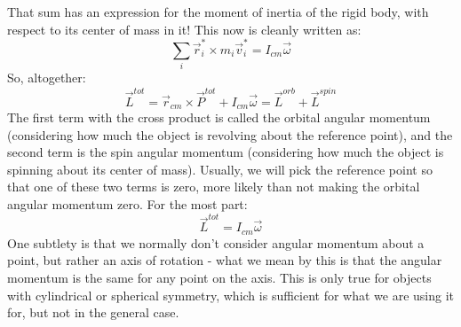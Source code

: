 That sum has an expression for the moment of inertia of the rigid body, with respect to its center of mass in it! This now is cleanly written as:
\[
	\sum_i \vec r_i^* \times m_i \vec v_i^* = I_{cm}\vec \omega
\]
So, altogether: 
\[
	\vec L^{tot} = \vec r_{cm} \times \vec P^{tot} + I_{cm} \vec \omega = \vec L^{orb} + \vec L^{spin} 
\]
The first term with the cross product is called the orbital angular momentum (considering how much the object is revolving about the reference point), and the second term is the spin angular momentum (considering how much the object is spinning about its center of mass). Usually, we will pick the reference point so that one of these two terms is zero, more likely than not making the orbital angular momentum zero. For the most part:
\[
	\vec L^{tot} = I_{cm} \vec \omega 
\]
One subtlety is that we normally don't consider angular momentum about a point, but rather an axis of rotation - what we mean by this is that the angular momentum is the same for any point on the axis. This is only true for objects with cylindrical or spherical symmetry, which is sufficient for what we are using it for, but not in the general case. 
